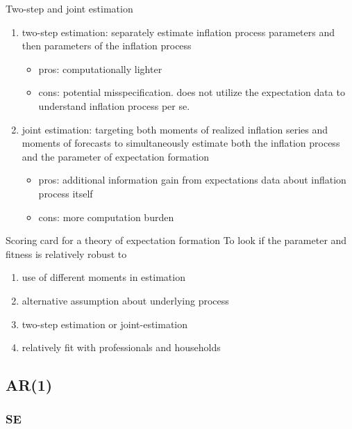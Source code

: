 \documentclass{beamer}
\begin{document}
\begin{frame}{Two-step and joint estimation}
	\begin{enumerate}
		\item two-step estimation:  separately estimate inflation process parameters and then parameters of the inflation process
		\begin{itemize}
			\item pros: computationally lighter 
			\item cons: potential misspecification. does not utilize the expectation data to understand inflation process per se.  
		\end{itemize}
		\item joint estimation: targeting both moments of realized inflation series and moments of forecasts to simultaneously estimate both the inflation process and the parameter of expectation formation
		\begin{itemize}
			\item pros: additional information gain from expectations data about inflation process itself
			\item cons: more computation burden  
		\end{itemize}
	\end{enumerate}
\end{frame}



\begin{frame}{Scoring card for a theory of expectation formation}
	To look if the parameter and fitness is relatively robust to 
	\begin{enumerate}
		\item use of different moments in estimation
		\item alternative assumption about underlying process 
		\item two-step estimation or joint-estimation 
		\item relatively fit with professionals and households  
	\end{enumerate}
\end{frame}

\subsection{AR(1)}

\subsubsection{SE}
\end{document}
